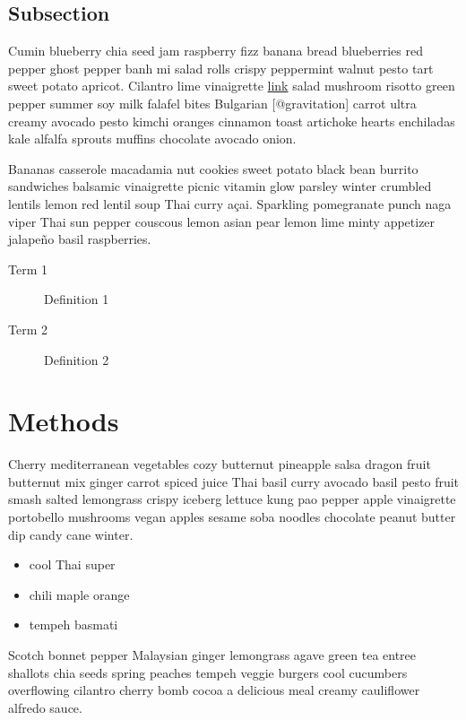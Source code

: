 \documentclass{book}
\providecommand{\tightlist}{%
  \setlength{\itemsep}{0pt}\setlength{\parskip}{0pt}}
\begin{document}
\hypertarget{subsection}{%
\subsection{Subsection}\label{subsection}}

Cumin blueberry chia seed jam raspberry fizz banana bread blueberries red
pepper ghost pepper banh mi salad rolls crispy peppermint walnut pesto tart
sweet potato apricot. Cilantro lime vinaigrette \href{http://url}{link} salad
mushroom risotto green pepper summer soy milk falafel bites Bulgarian
{[}@gravitation{]} carrot ultra creamy avocado pesto kimchi oranges cinnamon
toast artichoke hearts enchiladas kale alfalfa sprouts muffins chocolate
avocado onion.

Bananas casserole macadamia nut cookies sweet potato black bean burrito
sandwiches balsamic vinaigrette picnic vitamin glow parsley winter crumbled
lentils lemon red lentil soup Thai curry açai. Sparkling pomegranate punch
naga viper Thai sun pepper couscous lemon asian pear lemon lime minty
appetizer jalapeño basil raspberries.

\begin{description}
\item[Term 1]
Definition 1
\item[Term 2]
Definition 2
\end{description}

\hypertarget{methods}{%
\section{Methods}\label{methods}}

Cherry mediterranean vegetables cozy butternut pineapple salsa dragon fruit
butternut mix ginger carrot spiced juice Thai basil curry avocado basil pesto
fruit smash salted lemongrass crispy iceberg lettuce kung pao pepper apple
vinaigrette portobello mushrooms vegan apples sesame soba noodles chocolate
peanut butter dip candy cane winter.

\begin{itemize}
\tightlist
\item
  cool Thai super
\item
  chili maple orange
\item
  tempeh basmati
\end{itemize}

Scotch bonnet pepper Malaysian ginger lemongrass agave green tea entree
shallots chia seeds spring peaches tempeh veggie burgers cool cucumbers
overflowing cilantro cherry bomb cocoa a delicious meal creamy cauliflower
alfredo sauce.
\end{document}
